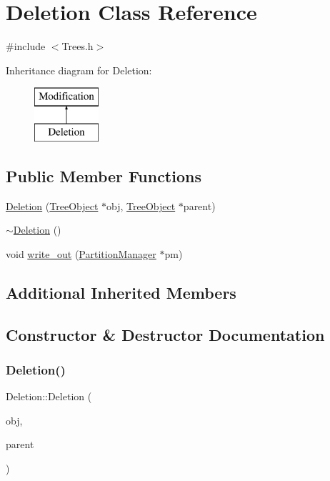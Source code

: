 \hypertarget{class_deletion}{}\section{Deletion Class Reference}
\label{class_deletion}


{\ttfamily \#include $<$Trees.\+h$>$}

Inheritance diagram for Deletion\+:\begin{figure}[H]
\begin{center}
\leavevmode
\includegraphics[height=2.000000cm]{class_deletion}
\end{center}
\end{figure}
\subsection*{Public Member Functions}
\begin{DoxyCompactItemize}
\item 
\mbox{\hyperlink{class_deletion_a8446318e3f7004ef557b6021350fa389}{Deletion}} (\mbox{\hyperlink{class_tree_object}{Tree\+Object}} $\ast$obj, \mbox{\hyperlink{class_tree_object}{Tree\+Object}} $\ast$parent)
\item 
\mbox{\hyperlink{class_deletion_ad56d54e1ab5d4d2a875b6093c05ba1d8}{$\sim$\+Deletion}} ()
\item 
void \mbox{\hyperlink{class_deletion_ac5bdb21c4a8dbc8afea9910435e509a8}{write\+\_\+out}} (\mbox{\hyperlink{class_partition_manager}{Partition\+Manager}} $\ast$pm)
\end{DoxyCompactItemize}
\subsection*{Additional Inherited Members}


\subsection{Constructor \& Destructor Documentation}
\mbox{\label{class_deletion_a8446318e3f7004ef557b6021350fa389}} 
\subsubsection{\texorpdfstring{Deletion()}{Deletion()}}
{\footnotesize\ttfamily Deletion\+::\+Deletion (\begin{DoxyParamCaption}\item[{\mbox{\hyperlink{class_tree_object}{Tree\+Object}} $\ast$}]{obj,  }\item[{\mbox{\hyperlink{class_tree_object}{Tree\+Object}} $\ast$}]{parent }\end{DoxyParamCaption})}

